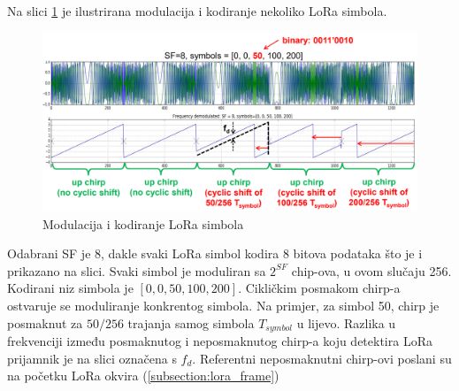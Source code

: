 \noindent
Na slici \ref{img:demodulation} je ilustrirana modulacija i kodiranje nekoliko LoRa simbola. 	
\begin{figure}[ht!]
	\centering
	\includegraphics[width=1.0\textwidth]{images/demodulation.png}
	\caption{Modulacija i kodiranje LoRa simbola}
	\label{img:demodulation}
\end{figure}
Odabrani SF je 8, dakle svaki LoRa simbol kodira 8 bitova podataka što je i prikazano na slici. Svaki simbol je moduliran sa $2^{SF}$ chip-ova, u ovom slučaju 256. Kodirani niz simbola je $ [0,0,50,100,200]$. Cikličkim posmakom chirp-a ostvaruje se moduliranje konkrentog simbola. Na primjer, za simbol 50, chirp je posmaknut za $50/256$ trajanja samog simbola $T_{symbol}$ u lijevo. Razlika u frekvenciji između posmaknutog i neposmaknutog chirp-a koju detektira LoRa prijamnik je na slici označena s $f_{d}$. Referentni neposmaknutni chirp-ovi poslani su na početku LoRa okvira (\ref{subsection:lora_frame})

